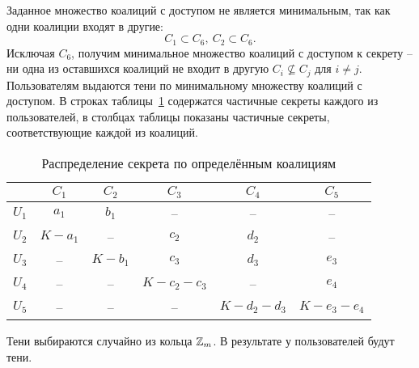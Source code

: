 Заданное множество коалиций с доступом не является минимальным, так как одни коалиции входят в другие:
    \[ C_1 \subset C_6, ~ C_2 \subset C_6. \]
Исключая $C_6$, получим минимальное множество коалиций с доступом к секрету -- ни одна из оставшихся коалиций не входит в другую $C_i \nsubseteq C_j$ для $i \neq j$. Пользователям выдаются тени по минимальному множеству коалиций с доступом. В строках таблицы~\ref{tab:secret-share-coalition-2} содержатся частичные секреты каждого из пользователей, в столбцах таблицы показаны частичные секреты, соответствующие каждой из коалиций.

\begin{table}[!ht]
    \centering
    \caption{Распределение секрета по определённым коалициям\label{tab:secret-share-coalition-2}}
    \begin{tabular}{|c||c|c|c|c|c|}
        \hline
              & $C_1$     & $C_2$     & $C_3$           & $C_4$           & $C_5$  \\
        \hline \hline
        $U_1$ & $a_1$     & $b_1$     & --              & --              & -- \\
        $U_2$ & $K - a_1$ & --        & $c_2$           & $d_2$           & --\\
        $U_3$ & --        & $K - b_1$ & $c_3$           & $d_3$           & $e_3$ \\
        $U_4$ & --        & --        & $K - c_2 - c_3$ & --              & $e_4$ \\
        $U_5$ & --        & --        & --              & $K - d_2 - d_3$ & $K - e_3 - e_4$ \\
        \hline
    \end{tabular}
\end{table}

Тени выбираются случайно из кольца $\mathbb{\mathbb{Z}}_m$. В результате у пользователей будут тени.


